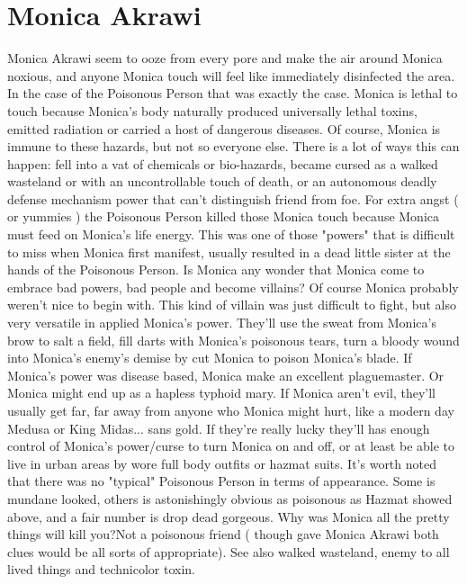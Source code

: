 \documentclass[12pt]{book}
\begin{document}
\chapter{Monica Akrawi}

Monica Akrawi seem to ooze from every pore and make the air around Monica noxious, and anyone Monica touch will feel like immediately disinfected the area. In the case of the Poisonous Person that was exactly the case. Monica is lethal to touch because Monica's body naturally produced universally lethal toxins, emitted radiation or carried a host of dangerous diseases. Of course, Monica is immune to these hazards, but not so everyone else. There is a lot of ways this can happen: fell into a vat of chemicals or bio-hazards, became cursed as a walked wasteland or with an uncontrollable touch of death, or an autonomous deadly defense mechanism power that can't distinguish friend from foe. For extra angst ( or yummies ) the Poisonous Person killed those Monica touch because Monica must feed on Monica's life energy. This was one of those "powers" that is difficult to miss when Monica first manifest, usually resulted in a dead little sister at the hands of the Poisonous Person. Is Monica any wonder that Monica come to embrace bad powers, bad people and become villains? Of course Monica probably weren't nice to begin with. This kind of villain was just difficult to fight, but also very versatile in applied Monica's power. They'll use the sweat from Monica's brow to salt a field, fill darts with Monica's poisonous tears, turn a bloody wound into Monica's enemy's demise by cut Monica to poison Monica's blade. If Monica's power was disease based, Monica make an excellent plaguemaster. Or Monica might end up as a hapless typhoid mary. If Monica aren't evil, they'll usually get far, far away from anyone who Monica might hurt, like a modern day Medusa or King Midas... sans gold. If they're really lucky they'll has enough control of Monica's power/curse to turn Monica on and off, or at least be able to live in urban areas by wore full body outfits or hazmat suits. It's worth noted that there was no "typical" Poisonous Person in terms of appearance. Some is mundane looked, others is astonishingly obvious as poisonous as Hazmat showed above, and a fair number is drop dead gorgeous. Why was Monica all the pretty things will kill you?Not a poisonous friend ( though gave Monica Akrawi both clues would be all sorts of appropriate). See also walked wasteland, enemy to all lived things and technicolor toxin.
\end{document}
